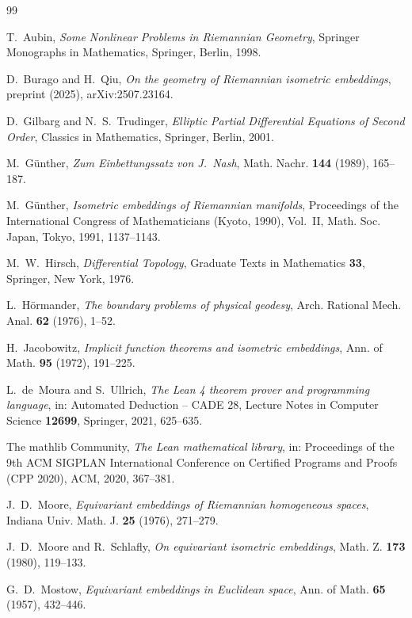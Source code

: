 \documentclass[11pt]{amsart}
\theoremstyle{definition}
\begin{document}
\begin{thebibliography}{99}

T.~Aubin, \emph{Some Nonlinear Problems in Riemannian Geometry}, Springer Monographs in
Mathematics, Springer, Berlin, 1998.

D.~Burago and H.~Qiu, \emph{On the geometry of Riemannian isometric embeddings}, preprint (2025),
arXiv:2507.23164.

D.~Gilbarg and N.~S.~Trudinger, \emph{Elliptic Partial Differential Equations of Second Order},
Classics in Mathematics, Springer, Berlin, 2001.

M.~G\"unther, \emph{Zum Einbettungssatz von J.~Nash}, Math. Nachr. \textbf{144} (1989), 165--187.

M.~G\"unther, \emph{Isometric embeddings of Riemannian manifolds}, Proceedings of the International
Congress of Mathematicians (Kyoto, 1990), Vol.~II, Math. Soc. Japan, Tokyo, 1991, 1137--1143.

M.~W.~Hirsch, \emph{Differential Topology}, Graduate Texts in Mathematics \textbf{33}, Springer,
New York, 1976.

L.~H\"ormander, \emph{The boundary problems of physical geodesy}, Arch. Rational Mech. Anal.
\textbf{62} (1976), 1--52.

H.~Jacobowitz, \emph{Implicit function theorems and isometric embeddings}, Ann. of Math.
\textbf{95} (1972), 191--225.

L.~de~Moura and S.~Ullrich, \emph{The Lean 4 theorem prover and programming language}, in:
Automated Deduction -- CADE 28, Lecture Notes in Computer Science \textbf{12699}, Springer, 2021,
625--635.

The mathlib Community, \emph{The Lean mathematical library}, in: Proceedings of the 9th ACM SIGPLAN
International Conference on Certified Programs and Proofs (CPP 2020), ACM, 2020, 367--381.

J.~D.~Moore, \emph{Equivariant embeddings of Riemannian homogeneous spaces}, Indiana Univ. Math. J.
\textbf{25} (1976), 271--279.

J.~D.~Moore and R.~Schlafly, \emph{On equivariant isometric embeddings}, Math. Z. \textbf{173}
(1980), 119--133.

G.~D.~Mostow, \emph{Equivariant embeddings in Euclidean space}, Ann. of Math. \textbf{65} (1957),
432--446.


\end{thebibliography}
\end{document}
